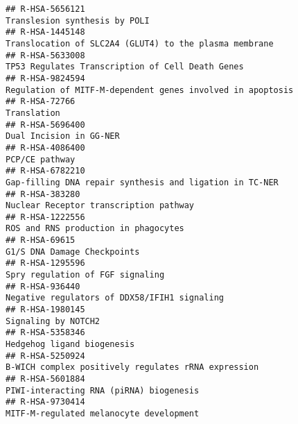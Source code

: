 \documentclass[
]{article}
\begin{document}
\begin{verbatim}
## R-HSA-5656121                                                                                                        Translesion synthesis by POLI
## R-HSA-1445148                                                                               Translocation of SLC2A4 (GLUT4) to the plasma membrane
## R-HSA-5633008                                                                                     TP53 Regulates Transcription of Cell Death Genes
## R-HSA-9824594                                                                           Regulation of MITF-M-dependent genes involved in apoptosis
## R-HSA-72766                                                                                                                            Translation
## R-HSA-5696400                                                                                                              Dual Incision in GG-NER
## R-HSA-4086400                                                                                                                       PCP/CE pathway
## R-HSA-6782210                                                                              Gap-filling DNA repair synthesis and ligation in TC-NER
## R-HSA-383280                                                                                                Nuclear Receptor transcription pathway
## R-HSA-1222556                                                                                                 ROS and RNS production in phagocytes
## R-HSA-69615                                                                                                            G1/S DNA Damage Checkpoints
## R-HSA-1295596                                                                                                     Spry regulation of FGF signaling
## R-HSA-936440                                                                                          Negative regulators of DDX58/IFIH1 signaling
## R-HSA-1980145                                                                                                                  Signaling by NOTCH2
## R-HSA-5358346                                                                                                           Hedgehog ligand biogenesis
## R-HSA-5250924                                                                                  B-WICH complex positively regulates rRNA expression
## R-HSA-5601884                                                                                              PIWI-interacting RNA (piRNA) biogenesis
## R-HSA-9730414                                                                                              MITF-M-regulated melanocyte development

\end{verbatim}
\end{document}
